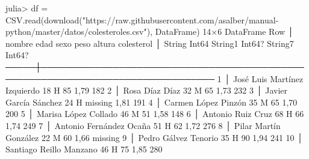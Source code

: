 \documentclass[
  letterpaper,
  DIV=11,
  numbers=noendperiod]{scrreprt}
\newenvironment{Shaded}{\begin{snugshade}}{\end{snugshade}}
\newcommand{\ConstantTok}[1]{\textcolor[rgb]{0.56,0.35,0.01}{#1}}
\newcommand{\DataTypeTok}[1]{\textcolor[rgb]{0.68,0.00,0.00}{#1}}
\newcommand{\FloatTok}[1]{\textcolor[rgb]{0.68,0.00,0.00}{#1}}
\newcommand{\FunctionTok}[1]{\textcolor[rgb]{0.28,0.35,0.67}{#1}}
\newcommand{\NormalTok}[1]{\textcolor[rgb]{0.00,0.23,0.31}{#1}}
\newcommand{\OperatorTok}[1]{\textcolor[rgb]{0.37,0.37,0.37}{#1}}
\newcommand{\StringTok}[1]{\textcolor[rgb]{0.13,0.47,0.30}{#1}}
\begin{document}
\begin{Shaded}
\begin{Highlighting}[]
\NormalTok{julia}\OperatorTok{\textgreater{}}\NormalTok{ df }\OperatorTok{=}\NormalTok{ CSV.}\FunctionTok{read}\NormalTok{(}\FunctionTok{download}\NormalTok{(}\StringTok{"https://raw.githubusercontent.com/asalber/manual{-}python/master/datos/colesteroles.csv"}\NormalTok{), DataFrame)}
\FloatTok{14}\OperatorTok{×}\FloatTok{6}\NormalTok{ DataFrame}
\NormalTok{ Row │ nombre                           edad   sexo     peso     altura   colesterol }
\NormalTok{     │ }\DataTypeTok{String}                           \DataTypeTok{Int64}\NormalTok{  String1  }\DataTypeTok{Int64}\NormalTok{?   String7  }\DataTypeTok{Int64}\NormalTok{?     }
\NormalTok{─────┼───────────────────────────────────────────────────────────────────────────────}
   \FloatTok{1}\NormalTok{ │ José Luis Martínez Izquierdo        }\FloatTok{18}\NormalTok{  H             }\FloatTok{85}  \FloatTok{1}\NormalTok{,}\FloatTok{79}            \FloatTok{182}
   \FloatTok{2}\NormalTok{ │ Rosa Díaz Díaz                      }\FloatTok{32}\NormalTok{  M             }\FloatTok{65}  \FloatTok{1}\NormalTok{,}\FloatTok{73}            \FloatTok{232}
   \FloatTok{3}\NormalTok{ │ Javier García Sánchez               }\FloatTok{24}\NormalTok{  H        }\ConstantTok{missing}  \FloatTok{1}\NormalTok{,}\FloatTok{81}            \FloatTok{191}
   \FloatTok{4}\NormalTok{ │ Carmen López Pinzón                 }\FloatTok{35}\NormalTok{  M             }\FloatTok{65}  \FloatTok{1}\NormalTok{,}\FloatTok{70}            \FloatTok{200}
   \FloatTok{5}\NormalTok{ │ Marisa López Collado                }\FloatTok{46}\NormalTok{  M             }\FloatTok{51}  \FloatTok{1}\NormalTok{,}\FloatTok{58}            \FloatTok{148}
   \FloatTok{6}\NormalTok{ │ Antonio Ruiz Cruz                   }\FloatTok{68}\NormalTok{  H             }\FloatTok{66}  \FloatTok{1}\NormalTok{,}\FloatTok{74}            \FloatTok{249}
   \FloatTok{7}\NormalTok{ │ Antonio Fernández Ocaña             }\FloatTok{51}\NormalTok{  H             }\FloatTok{62}  \FloatTok{1}\NormalTok{,}\FloatTok{72}            \FloatTok{276}
   \FloatTok{8}\NormalTok{ │ Pilar Martín González               }\FloatTok{22}\NormalTok{  M             }\FloatTok{60}  \FloatTok{1}\NormalTok{,}\FloatTok{66}        \ConstantTok{missing} 
   \FloatTok{9}\NormalTok{ │ Pedro Gálvez Tenorio                }\FloatTok{35}\NormalTok{  H             }\FloatTok{90}  \FloatTok{1}\NormalTok{,}\FloatTok{94}            \FloatTok{241}
  \FloatTok{10}\NormalTok{ │ Santiago Reillo Manzano             }\FloatTok{46}\NormalTok{  H             }\FloatTok{75}  \FloatTok{1}\NormalTok{,}\FloatTok{85}            \FloatTok{280}

\end{Highlighting}
\end{Shaded}
\end{document}
